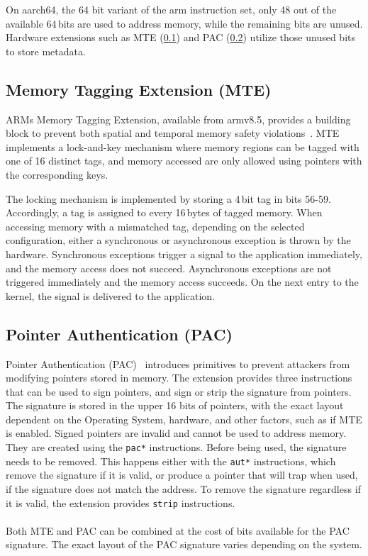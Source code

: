 On aarch64, the 64 bit variant of the arm instruction set, only 48 out of the available 64\,bits are used to address memory, while the remaining bits are unused.
Hardware extensions such as MTE (\cref{subsec:mte}) and PAC (\cref{subsec:pac}) utilize those unused bits to store metadata.

\subsection{Memory Tagging Extension (MTE)}
\label{subsec:mte}

ARMs Memory Tagging Extension, available from armv8.5, provides a building block to prevent both spatial and temporal memory safety violations~\cite{ARM2019MTE}.
MTE implements a lock-and-key mechanism where memory regions can be tagged with one of 16 distinct tags, and memory accessed are only allowed using pointers with the corresponding keys.

The locking mechanism is implemented by storing a 4\,bit tag in bits 56-59.
Accordingly, a tag is assigned to every 16\,bytes of tagged memory.
When accessing memory with a mismatched tag, depending on the selected configuration, either a synchronous or asynchronous exception is thrown by the hardware.
Synchronous exceptions trigger a signal to the application immediately, and the memory access does not succeed.
Asynchronous exceptions are not triggered immediately and the memory access succeeds.
On the next entry to the kernel, the signal is delivered to the application.

\subsection{Pointer Authentication (PAC)}
\label{subsec:pac}

Pointer Authentication (PAC)~\cite{Qualcomm2017PointerAuth} introduces primitives to prevent attackers from modifying pointers stored in memory.
The extension provides three instructions that can be used to sign pointers, and sign or strip the signature from pointers.
The signature is stored in the upper 16 bits of pointers, with the exact layout dependent on the Operating System, hardware, and other factors, such as if MTE is enabled.
Signed pointers are invalid and cannot be used to address memory.
They are created using the \texttt{pac*} instructions.
Before being used, the signature needs to be removed.
This happens either with the \texttt{aut*} instructions, which remove the signature if it is valid, or produce a pointer that will trap when used, if the signature does not match the address.
To remove the signature regardless if it is valid, the extension provides \texttt{strip} instructions.

\paragraph{} Both MTE and PAC can be combined at the cost of bits available for the PAC signature.
The exact layout of the PAC signature varies depending on the system.
